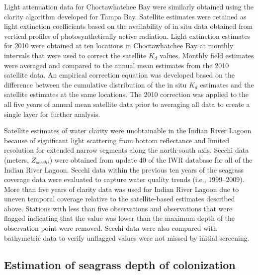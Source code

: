 \documentclass[letterpaper,12pt,oneside]{article}\usepackage[]{graphicx}\usepackage[]{color}
\begin{document}
Light attenuation data for Choctawhatchee Bay were similarly obtained using the clarity algorithm developed for Tampa Bay.  Satellite estimates were retained as light extinction coefficients based on the availability of in situ data obtained from vertical profiles of photosynthetically active radiation.  Light extinction estimates for 2010 were obtained at ten locations in Choctawhatchee Bay at monthly intervals that were used to correct the satellite $K_d$ values.  Monthly field estimates were averaged and compared to the annual mean estimates from the 2010 satellite data.  An empirical correction equation was developed based on the difference between the cumulative distribution of the in situ $K_d$ estimates and the satellite estimates at the same locations.  The 2010 correction was applied to the all five years of annual mean satellite data prior to averaging all data to create a single layer for further analysis. 

Satellite estimates of water clarity were unobtainable in the Indian River Lagoon because of significant light scattering from bottom reflectance and limited resolution for extended narrow segments along the north-south axis.  Secchi data (meters, $Z_{secchi}$) were obtained from update 40 of the \ac{IWR} database for all of the Indian River Lagoon. Secchi data within the previous ten years of the seagrass coverage data were evaluated to capture water quality trends (i.e., 1999--2009).  More than five years of clarity data was used for Indian River Lagoon due to uneven temporal coverage relative to the satellite-based estimates described above.  Stations with less than five observations and observations that were flagged indicating that the value was lower than the maximum depth of the observation point were removed.  Secchi data were also compared with bathymetric data to verify unflagged values were not missed by initial screening. 

\subsection{Estimation of seagrass depth of colonization} \label{sec:est_method}
\end{document}
